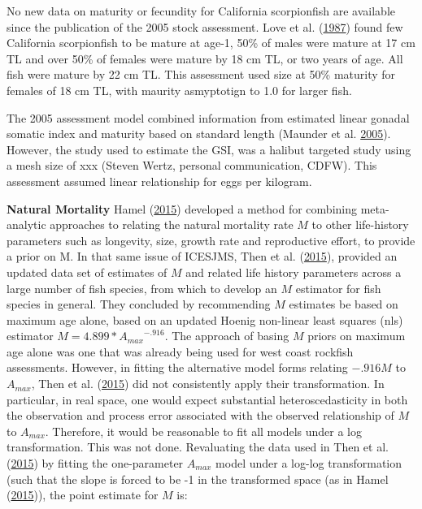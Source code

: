 \documentclass[12pt,]{article}
\begin{document}
No new data on maturity or fecundity for California scorpionfish are
available since the publication of the 2005 stock assessment. Love et
al. (\protect\hyperlink{ref-Love1987}{1987}) found few California
scorpionfish to be mature at age-1, 50\% of males were mature at 17 cm
TL and over 50\% of females were mature by 18 cm TL, or two years of
age. All fish were mature by 22 cm TL. This assessment used size at 50\%
maturity for females of 18 cm TL, with maurity asmyptotign to 1.0 for
larger fish.

The 2005 assessment model combined information from estimated linear
gonadal somatic index and maturity based on standard length (Maunder et
al. \protect\hyperlink{ref-Maunder2005}{2005}). However, the study used
to estimate the GSI, was a halibut targeted study using a mesh size of
xxx (Steven Wertz, personal communication, CDFW). This assessment
assumed linear relationship for eggs per kilogram.

\vspace{.5cm}

\textbf{Natural Mortality} Hamel
(\protect\hyperlink{ref-Hamel2015}{2015}) developed a method for
combining meta-analytic approaches to relating the natural mortality
rate \(M\) to other life-history parameters such as longevity, size,
growth rate and reproductive effort, to provide a prior on M. In that
same issue of ICESJMS, Then et al.
(\protect\hyperlink{ref-Then2015}{2015}), provided an updated data set
of estimates of \(M\) and related life history parameters across a large
number of fish species, from which to develop an \(M\) estimator for
fish species in general. They concluded by recommending \(M\) estimates
be based on maximum age alone, based on an updated Hoenig non-linear
least squares (nls) estimator \(M= 4.899*{A_{max}}^{-.916}\). The
approach of basing \(M\) priors on maximum age alone was one that was
already being used for west coast rockfish assessments. However, in
fitting the alternative model forms relating \(-.916M\) to \(A_{max}\),
Then et al. (\protect\hyperlink{ref-Then2015}{2015}) did not
consistently apply their transformation. In particular, in real space,
one would expect substantial heteroscedasticity in both the observation
and process error associated with the observed relationship of \(M\) to
\(A_{max}\). Therefore, it would be reasonable to fit all models under a
log transformation. This was not done. Revaluating the data used in Then
et al. (\protect\hyperlink{ref-Then2015}{2015}) by fitting the
one-parameter \(A_{max}\) model under a log-log transformation (such
that the slope is forced to be -1 in the transformed space (as in Hamel
(\protect\hyperlink{ref-Hamel2015}{2015})), the point estimate for \(M\)
is:
\end{document}
